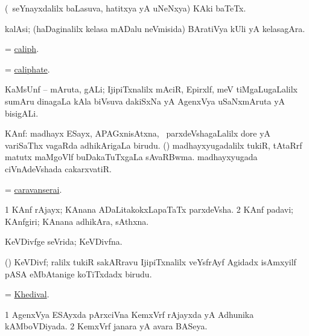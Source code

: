 \bentry
{}
\gl{\nA}
\bmng
(\kanmu\ seYnayxdalilx baLasuva, hatitxya yA uNeNxya) KAki baTeTx. 
\emng
\eentry

\bentry
{}
\gl{\nA}
\bmng
kalAsi; (haDaginalilx kelasa mADalu neVmisida) BAratiVya kUli yA kelasagAra. 
\emng
\eentry

\bentry
{}
\gl{\nA}
\bmng
= \hyperref{kandict_c.pdf}{C}{caliph}{caliph}. 
\emng
\eentry

\bentry
{}
\gl{\nA}
\bmng
= \hyperref{kandict_c.pdf}{C}{caliphate}{caliphate}. 
\emng
\eentry

\bentry
{}
\gl{\nA}
\bmng
KaMsUnf -- mAruta, gALi; IjipiTxnalilx mAciR, Epirxlf, meV tiMgaLugaLalilx sumAru  dinagaLa kAla biVsuva dakiSxNa yA AgenxVya uSaNxmAruta yA bisigALi. 
\emng
\eentry

\bentry
{}
\gl{\nA}
\bmng
KAnf: 
\banum
{} madhayx ESayx, APAGxnisAtxna, \mo\ parxdeVshagaLalilx dore yA variSaThx vagaRda adhikArigaLa birudu. 
 (\ca) madhayxyugadalilx tukiR, tAtaRrf matutx maMgoVlf buDakaTuTxgaLa sAvaRBwma. 
 madhayxyugada ciVnAdeVshada cakarxvatiR. 
\eanum
\emng
\eentry

\bentry
{}
\gl{\nA}
\bmng
= \hyperref{kandict_c.pdf}{C}{caravanserai}{caravanserai}. 
\emng
\eentry

\bentry
{}
\gl{\nA}
\bmng
\bnum
\num{1} KAnf rAjayx; KAnana ADaLitakokxLapaTaTx parxdeVsha. 
\num{2} KAnf padavi; KAnfgiri; KAnana adhikAra, sAthxna. 
\enum
\emng
\eentry

\bentry
{}
\gl{\gu}
\bmng
KeVDivfge seVrida; KeVDivfna. 
\emng
\eentry

\bentry
{}
\gl{\nA}
\bmng
(\ca) KeVDivf; ralilx tukiR sakARravu IjipiTxnalilx veYsfrAyf Agidadx isAmxyilf pASA eMbAtanige koTiTxdadx birudu. 
\emng
\eentry

\bentry
{}
\gl{\gu}
\bmng
 = \hyperlink{Khedival}{Khedival}. 
\emng
\eentry

\bentry
{}
\gl{\gu}
\bmng
\bnum
\num{1} AgenxVya ESAyxda pArxciVna KemxVrf rAjayxda yA Adhunika kAMboVDiyada. 
\num{2} KemxVrf janara yA avara BASeya. 
\enum
\emng
\eentry

